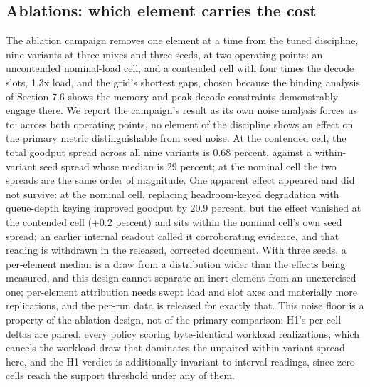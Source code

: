 \subsection{Ablations: which element carries the cost}

The ablation campaign removes one element at a time from the tuned
discipline, nine variants at three mixes and three seeds, at two operating
points: an uncontended nominal-load cell, and a contended cell with four
times the decode slots, 1.3x load, and the grid's shortest gaps, chosen
because the binding analysis of Section 7.6 shows the memory and
peak-decode constraints demonstrably engage there. We report the campaign's
result as its own noise analysis forces us to: across both operating
points, no element of the discipline shows an effect on the primary metric
distinguishable from seed noise. At the contended cell, the total goodput
spread across all nine variants is 0.68 percent, against a within-variant
seed spread whose median is 29 percent; at the nominal cell the two spreads
are the same order of magnitude. One apparent effect appeared and did not
survive: at the nominal cell, replacing headroom-keyed degradation with
queue-depth keying improved goodput by 20.9 percent, but the effect
vanished at the contended cell (+0.2 percent) and sits within the nominal
cell's own seed spread; an earlier internal readout called it corroborating
evidence, and that reading is withdrawn in the released, corrected
document. With three seeds, a per-element median is a draw from a
distribution wider than the effects being measured, and this design cannot
separate an inert element from an unexercised one; per-element attribution
needs swept load and slot axes and materially more replications, and the
per-run data is released for exactly that. This noise floor is a property
of the ablation design, not of the primary comparison: H1's per-cell
deltas are paired, every policy scoring byte-identical workload
realizations, which cancels the workload draw that dominates the unpaired
within-variant spread here, and the H1 verdict is additionally invariant
to interval readings, since zero cells reach the support threshold under
any of them.


